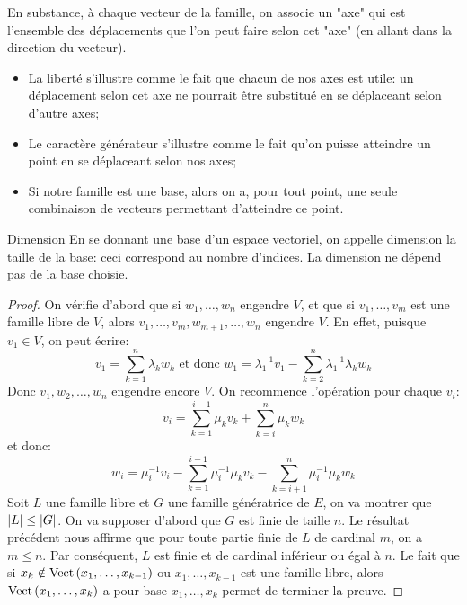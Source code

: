 \documentclass{classe}
\begin{document}
En substance, à chaque vecteur de la famille, on associe un "axe" qui est l'ensemble des déplacements que l'on peut faire selon cet "axe" (en allant dans la direction du vecteur).
\begin{itemize}
	\item La liberté s'illustre comme le fait que chacun de nos axes est utile: un déplacement selon cet axe ne pourrait être substitué en se déplaceant selon d'autre axes;
	\item Le caractère générateur s'illustre comme le fait qu'on puisse atteindre un point en se déplaceant selon nos axes;
	\item Si notre famille est une base, alors on a, pour tout point, une seule combinaison de vecteurs permettant d'atteindre ce point.
\end{itemize}

\begin{définition}{Dimension}{}
	En se donnant une base d'un espace vectoriel, on appelle dimension la taille de la base: ceci correspond au nombre d'indices. La dimension ne dépend pas de la base choisie.
\end{définition}
\begin{proof}
	On vérifie d'abord que si $w_{1}, \ldots, w_{n}$ engendre $V$, et que si $v_{1}, \ldots, v_{m}$ est une famille libre de $V$, alors $v_{1}, \ldots, v_{m}, w_{m + 1}, \ldots, w_{n}$ engendre $V$.
	En effet, puisque $v_{1} \in V$, on peut écrire:
	\begin{equation*}
		v_{1} = \sum_{k = 1}^{n} \lambda_{k}w_{k} \text{ et donc } w_{1} = \lambda_{1}^{-1}v_{1} - \sum_{k = 2}^{n} \lambda_{1}^{-1}\lambda_{k}w_{k}
	\end{equation*}
	Donc $v_{1}, w_{2}, \ldots, w_{n}$ engendre encore $V$.
	On recommence l'opération pour chaque $v_{i}$:
	\begin{equation*}
		v_{i} = \sum_{k = 1}^{i - 1}\mu_{k}v_{k} + \sum_{k = i}^{n}\mu_{k}w_{k}
	\end{equation*}
	et donc:
	\begin{equation*}
		w_{i} = \mu_{i}^{-1}v_{i} - \sum_{k = 1}^{i - 1}\mu_{i}^{-1}\mu_{k}v_{k} - \sum_{k = i + 1}^{n}\mu_{i}^{-1}\mu_{k}w_{k}
	\end{equation*}
	Soit $L$ une famille libre et $G$ une famille génératrice de $E$, on va montrer que $\left|L\right| \leq \left|G\right|$.
	On va supposer d'abord que $G$ est finie de taille $n$. Le résultat précédent nous affirme que pour toute partie finie de $L$ de cardinal $m$, on a $m \leq n$.
	Par conséquent, $L$ est finie et de cardinal inférieur ou égal à $n$.
	Le fait que si $x_{k} \notin \operatorname{Vect}\left( x_{1}, \ldots, x_{k - 1} \right)$ ou $x_{1}, \ldots, x_{k - 1}$ est une famille libre, alors $\operatorname{Vect}\left( x_{1}, \ldots, x_{k} \right)$ a pour base $x_{1}, \ldots, x_{k}$ permet de terminer la preuve.
\end{proof}
\end{document}
